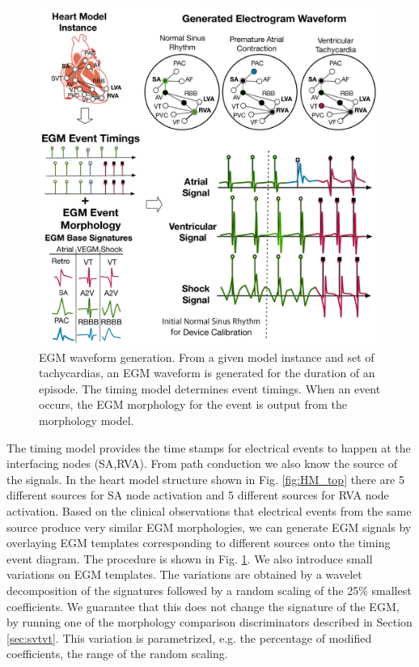 \begin{figure}[t]
	\centering
	\includegraphics[scale=0.3]{figures/figEGMGeneration1column.pdf}
	\vspace{-15pt}
	\caption{\small \ac{EGM} waveform generation.
		From a given model instance and set of tachycardias, an EGM waveform is generated for the duration of an episode. The timing model determines event timings. When an event occurs, the EGM morphology for the event is output from the morphology model.  
		}
	\vspace{-15pt}
	\label{fig:egmGeneration}
\end{figure}
The timing model provides the time stamps for electrical events to happen at the interfacing nodes (SA,RVA). 
From path conduction we also know the source of the signals.
In the heart model structure shown in Fig. \ref{fig:HM_top} there are 5 different sources for SA node activation and 5 different sources for RVA node activation. 
Based on the clinical observations that electrical events from the same source produce very similar \ac{EGM} morphologies, we can generate EGM signals by overlaying EGM templates corresponding to different sources onto the timing event diagram.
The procedure is shown in Fig. \ref{fig:egmGeneration}.
We also introduce small variations on EGM templates.
The variations are obtained by a wavelet decomposition of the signatures followed by a random scaling of the 25\% smallest coefficients.
We guarantee that this does not change the signature of the \ac{EGM}, by running one of the morphology comparison discriminators described in Section \ref{sec:svtvt}.
This variation is parametrized, e.g. the percentage of modified coefficients, the range of the random scaling.

